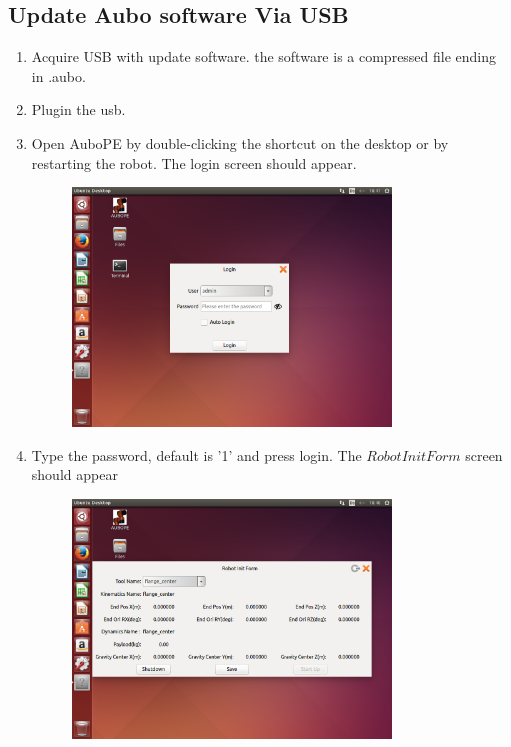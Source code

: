 \documentclass{article}
\begin{document}
\subsection{Update Aubo software Via USB}
\begin{enumerate}
\item Acquire USB with update software. the software is a compressed file ending in .aubo. 
\item Plugin the usb. 
\item Open AuboPE by double-clicking the shortcut on the desktop
 or by restarting the robot. The login screen should appear.
\begin{figure}[H]\centering
\includegraphics[width=0.8\textwidth]{../../Images/loginScreen.png}
\end{figure}
\item  Type the password, default is '1' and press login. The $Robot Init Form$ screen should appear
\begin{figure}[H]\centering
\includegraphics[width=0.8\textwidth]{../../Images/RobotInitForm.png}

\end{figure}
\end{enumerate}
\end{document}
